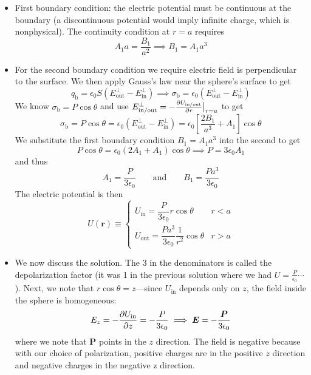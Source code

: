\documentclass[11pt, a4paper]{article}
\newcommand{\eqtext}[1]{\qquad \text{#1} \qquad}
\renewcommand{\vec}[1]{\bm{#1}} %
\renewcommand{\r}{\vec{r}}
\newcommand{\E}{\vec{E}}  %
\newcommand{\ee}{\epsilon_{0}}  %
\renewcommand{\P}{\vec{P}}  %
\begin{document}
\begin{itemize}
	\item First boundary condition: the electric potential must be continuous at the boundary (a discontinuous potential would imply infinite charge, which is nonphysical). The continuity condition at $ r = a $ requires
	\begin{equation*}
		A_{1}a = \frac{B_{1}}{a^{2}} \implies B_{1} = A_{1}a^{3}
	\end{equation*}
	
	\item For the second boundary condition we require electric field is perpendicular to the surface. We then apply Gauss's law near the sphere's surface to get
	\begin{equation*}
		q_{\text{b}} = \ee S (E_{\text{out}}^{\perp} - E_{\text{in}}^{\perp})  \implies \sigma_{\text{b}} = \ee (E_{\text{out}}^{\perp} - E_{\text{in}}^{\perp})
	\end{equation*}
	We know $ \sigma_{\text{b}} = P \cos \theta $ and use $ E_{\text{in/out}}^{\perp} = - \pdv{U_{\text{in/out}}}{r}\big |_{r = a} $ to get
	\begin{equation*}
		\sigma_{\text{b}} = P\cos \theta = \ee (E_{\text{out}}^{\perp} - E_{\text{in}}^{\perp}) = \ee \left[  \frac{2B_{1}}{a^{3}} + A_{1}\right]\cos \theta 
	\end{equation*}
	We substitute the first boundary condition $ B_{1} = A_{1}a^{3} $ into the second to get
	\begin{equation*}
		P \cos \theta = \ee \left(2A_{1} + A_{1}\right)\cos \theta \implies P = 3 \ee A_{1} 
	\end{equation*}
	and thus
	\begin{equation*}
		A_{1} = \frac{P}{3\ee} \eqtext{and} B_{1} = \frac{Pa^{3}}{3\ee}
	\end{equation*}
	The electric potential is then
	\begin{equation*}
		U(\r) \equiv 
		\begin{cases}
			U_{\text{in}} = \dfrac{P}{3\ee} r \cos \theta & r < a\\[3mm]
			U_{\text{out}} = \dfrac{Pa^{3}}{3\ee}\dfrac{1}{r^{2}}\cos \theta & r > a
		\end{cases}
	\end{equation*}
	
	\item We now discuss the solution. The 3 in the denominators is called the depolarization factor (it was 1 in the previous solution where we had $ U = \frac{P}{\ee}\cdots $). Next, we note that $ r \cos \theta = z $---since $ U_{\text{in}} $ depends only on $ z $, the field inside the sphere is homogeneous:
	\begin{equation*}
		E_{z} = - \pdv{U_{\text{in}}}{z} = -\frac{P}{3\ee} \implies \E = - \frac{\P}{3\ee}
	\end{equation*}
	where we note that $ \P $ points in the $ z $ direction. The field is negative because with our choice of polarization, positive charges are in the positive $ z $ direction and negative charges in the negative z direction. 
	

\end{itemize}
\end{document}
